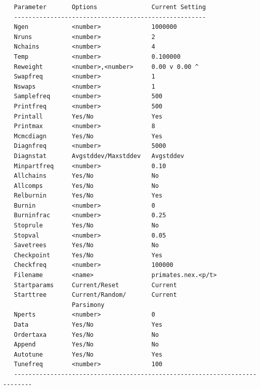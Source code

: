 \documentclass[12pt]{book}
\begin{document}
\begin{singlespacing}
\footnotesize
\begin{verbatim}
   Parameter       Options               Current Setting                         
   -----------------------------------------------------                         
   Ngen            <number>              1000000                                      
   Nruns           <number>              2                                      
   Nchains         <number>              4                                      
   Temp            <number>              0.100000                                     
   Reweight        <number>,<number>     0.00 v 0.00 ^                       
   Swapfreq        <number>              1                                      
   Nswaps          <number>              1                                      
   Samplefreq      <number>              500                                      
   Printfreq       <number>              500                                      
   Printall        Yes/No                Yes                                      
   Printmax        <number>              8                                      
   Mcmcdiagn       Yes/No                Yes                                     
   Diagnfreq       <number>              5000                                      
   Diagnstat       Avgstddev/Maxstddev   Avgstddev                                     
   Minpartfreq     <number>              0.10                                 
   Allchains       Yes/No                No                                     
   Allcomps        Yes/No                No                                     
   Relburnin       Yes/No                Yes                                     
   Burnin          <number>              0                                     
   Burninfrac      <number>              0.25                                 
   Stoprule        Yes/No                No                                     
   Stopval         <number>              0.05                                 
   Savetrees       Yes/No                No                                     
   Checkpoint      Yes/No                Yes                                     
   Checkfreq       <number>              100000                                     
   Filename        <name>                primates.nex.<p/t>
   Startparams     Current/Reset         Current                                     
   Starttree       Current/Random/       Current                                     
                   Parsimony                                                    
   Nperts          <number>              0                                     
   Data            Yes/No                Yes                                     
   Ordertaxa       Yes/No                No                                     
   Append          Yes/No                No                                     
   Autotune        Yes/No                Yes                                     
   Tunefreq        <number>              100                                       
   ---------------------------------------------------------------------------   
\end{verbatim}
\normalsize
\end{singlespacing}
\end{document}
